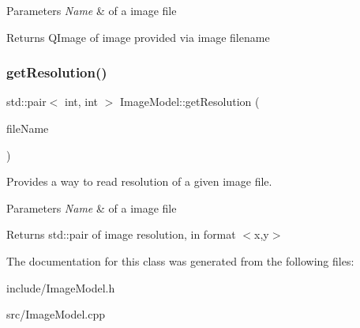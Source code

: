 \begin{DoxyParams}{Parameters}
{\em Name} & of a image file \\
\hline
\end{DoxyParams}
\begin{DoxyReturn}{Returns}
Q\+Image of image provided via image filename 
\end{DoxyReturn}
\mbox{\label{classImageModel_af44b02e6974b36d2ede3b1b3f78ebc84}} 
\subsubsection{\texorpdfstring{get\+Resolution()}{getResolution()}}
{\footnotesize\ttfamily std\+::pair$<$ int, int $>$ Image\+Model\+::get\+Resolution (\begin{DoxyParamCaption}\item[{const Q\+String \&}]{file\+Name }\end{DoxyParamCaption})}



Provides a way to read resolution of a given image file. 


\begin{DoxyParams}{Parameters}
{\em Name} & of a image file \\
\hline
\end{DoxyParams}
\begin{DoxyReturn}{Returns}
std\+::pair of image resolution, in format $<$x,y$>$ 
\end{DoxyReturn}


The documentation for this class was generated from the following files\+:\begin{DoxyCompactItemize}
\item 
include/Image\+Model.\+h\item 
src/Image\+Model.\+cpp\end{DoxyCompactItemize}
